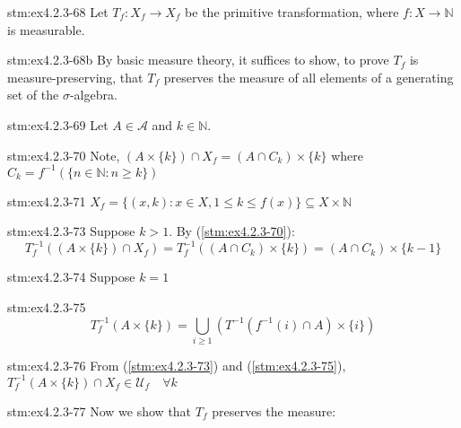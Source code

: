 \begin{statement}{stm:ex4.2.3-68}
Let $T_f : X_f \to X_f$ be the primitive transformation, where $f : X \to \mathbb{N}$ is measurable.
\end{statement}

\begin{explanation}{stm:ex4.2.3-68b}
By basic measure theory, it suffices to show, to prove $T_f$ is measure-preserving, that $T_f$ preserves the measure of all elements of a generating set of the $\sigma$-algebra.
\end{explanation}

\begin{statement}{stm:ex4.2.3-69}
Let $A \in \mathcal{A}$ and $k \in \mathbb{N}$.
\end{statement}

\begin{statement}{stm:ex4.2.3-70}
Note, $(A \times \{k\}) \cap X_f = (A \cap C_k) \times \{k\}$ where $C_k = f^{-1}(\{n \in \mathbb{N} : n \ge k\})$
\end{statement}

\begin{statement}{stm:ex4.2.3-71}
$X_f = \{(x,k) : x \in X, 1 \le k \le f(x)\} \subseteq X \times \mathbb{N}$
\end{statement}

\begin{statement}{stm:ex4.2.3-73}
Suppose $k > 1$. By (\ref{stm:ex4.2.3-70}):
\[
T_f^{-1}((A \times \{k\}) \cap X_f) = T_f^{-1}((A \cap C_k) \times \{k\}) = (A \cap C_k) \times \{k-1\}
\]
\end{statement}

\begin{statement}{stm:ex4.2.3-74}
Suppose $k = 1$
\end{statement}

\begin{statement}{stm:ex4.2.3-75}
\[
T_f^{-1}(A \times \{k\}) = \bigcup_{i \ge 1} (T^{-1}(f^{-1}(i) \cap A) \times \{i\})
\]
\end{statement}

\begin{statement}{stm:ex4.2.3-76}
From (\ref{stm:ex4.2.3-73}) and (\ref{stm:ex4.2.3-75}), $T_f^{-1}(A \times \{k\}) \cap X_f \in \mathcal{U}_f \quad \forall k$
\end{statement}

\begin{explanation}{stm:ex4.2.3-77}
Now we show that $T_f$ preserves the measure:
\end{explanation}

